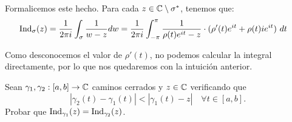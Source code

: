 \begin{ejercicio}
    Formalicemos este hecho. Para cada $z \in \mathbb{C}\setminus\sigma^*$, tenemos que:
    \begin{align*}
        \operatorname{Ind}_\sigma(z) &= \frac{1}{2\pi i} \int_{\sigma} \frac{1}{w - z} dw
        = \frac{1}{2\pi i} \int_{-\pi}^{\pi} \frac{1}{\rho(t)e^{it} - z} \cdot (\rho'(t)e^{it} + \rho(t)ie^{it})\ dt
    \end{align*}
    
    Como desconocemos el valor de $\rho'(t)$, no podemos calcular la integral directamente, por lo que nos quedaremos con la intuición anterior.
\end{ejercicio}

\begin{ejercicio}
    Sean $\gamma_1, \gamma_2 : [a,b] \to \mathbb{C}$ caminos cerrados y $z \in \mathbb{C}$ verificando que
    \begin{equation*}
        | \gamma_2(t) - \gamma_1(t) | < | \gamma_1(t) - z | \quad \forall t \in [a,b].
    \end{equation*}
    Probar que $\operatorname{Ind}_{\gamma_1}(z) = \operatorname{Ind}_{\gamma_2}(z)$.
\end{ejercicio}

